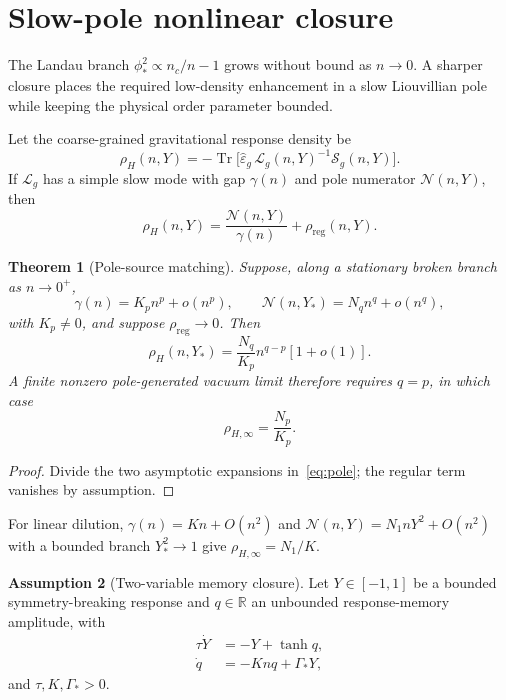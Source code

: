 \documentclass[11pt]{article}
\newtheorem{theorem}{Theorem}[section]
\theoremstyle{definition}
\newtheorem{assumption}[theorem]{Assumption}
\theoremstyle{remark}
\newcommand{\Tr}{\operatorname{Tr}}
\begin{document}
\section{Slow-pole nonlinear closure}
\label{sec:slow-pole}
The Landau branch $\phi_*^2\propto n_c/n-1$ grows without bound as $n\to0$.
A sharper closure places the required low-density enhancement in a slow Liouvillian pole while keeping the physical order parameter bounded.

Let the coarse-grained gravitational response density be
\begin{equation}
\label{eq:response}
\rho_H(n,Y)=-\Tr\!\bigl[\hat\varepsilon_g\,\mathcal L_g(n,Y)^{-1}\mathcal S_g(n,Y)\bigr].
\end{equation}
If $\mathcal L_g$ has a simple slow mode with gap $\gamma(n)$ and pole numerator $\mathcal N(n,Y)$, then
\begin{equation}
\label{eq:pole}
\boxed{\rho_H(n,Y)=\frac{\mathcal N(n,Y)}{\gamma(n)}+\rho_{\mathrm{reg}}(n,Y).}
\end{equation}

\begin{theorem}[Pole-source matching]
\label{thm:pole-match}
Suppose, along a stationary broken branch as $n\to0^+$,
\begin{equation}
\gamma(n)=K_p n^p+o(n^p),\qquad
\mathcal N(n,Y_*)=N_q n^q+o(n^q),
\end{equation}
with $K_p\neq0$, and suppose $\rho_{\mathrm{reg}}\to0$.
Then
\begin{equation}
\rho_H(n,Y_*)=\frac{N_q}{K_p}n^{q-p}[1+o(1)].
\end{equation}
A finite nonzero pole-generated vacuum limit therefore requires $q=p$, in which case
\begin{equation}
\boxed{\rho_{H,\infty}=\frac{N_p}{K_p}.}
\end{equation}
\end{theorem}

\begin{proof}
Divide the two asymptotic expansions in~\eqref{eq:pole}; the regular term vanishes by assumption.
\end{proof}

For linear dilution, $\gamma(n)=Kn+O(n^2)$ and $\mathcal N(n,Y)=N_1 n Y^2+O(n^2)$ with a bounded branch $Y_*^2\to1$ give $\rho_{H,\infty}=N_1/K$.

\begin{assumption}[Two-variable memory closure]
\label{ass:two-var}
Let $Y\in[-1,1]$ be a bounded symmetry-breaking response and $q\in\mathbb R$ an unbounded response-memory amplitude, with
\begin{align}
\label{eq:Ydyn}
\tau\dot Y&=-Y+\tanh q,\\
\label{eq:qdyn}
\dot q&=-Kn q+\Gamma_* Y,
\end{align}
and $\tau,K,\Gamma_*>0$.
\end{assumption}
\end{document}

